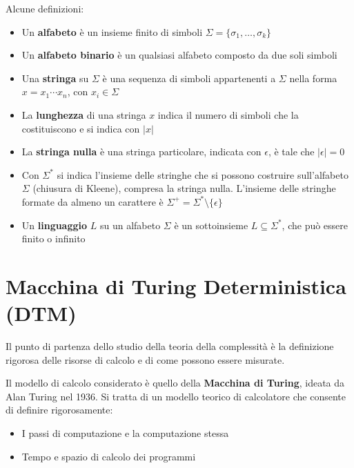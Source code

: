 Alcune definizioni:
\begin{itemize}
	\item Un \textbf{alfabeto} è un insieme finito di simboli $\Sigma = \{\sigma_1, \dots, \sigma_k\}$
	
    \item Un \textbf{alfabeto binario} è un qualsiasi alfabeto composto da due soli simboli
	
    \item Una \textbf{stringa} su $\Sigma$ è una sequenza di simboli appartenenti a $\Sigma$ nella forma $x = x_1 \cdots x_n$, con $x_i \in \Sigma$
	
    \item La \textbf{lunghezza} di una stringa $x$ indica il numero di simboli che la costituiscono e si indica con $|x|$
	
    \item La \textbf{stringa nulla} è una stringa particolare, indicata con $\epsilon$, è tale che $|\epsilon| = 0$
	
    \item Con $\Sigma^\ast$ si indica l'insieme delle stringhe che si possono costruire sull'alfabeto $\Sigma$ (chiusura di Kleene), compresa la stringa nulla. L'insieme delle stringhe formate da almeno un carattere è $\Sigma^+ = \Sigma^\ast \setminus \{\epsilon\}$
	
    \item Un \textbf{linguaggio} $L$ su un alfabeto $\Sigma$ è un sottoinsieme $L \subseteq \Sigma^\ast$, che può essere finito o infinito
\end{itemize}

\section{Macchina di Turing Deterministica (DTM)}

Il punto di partenza dello studio della teoria della complessità è la definizione rigorosa delle risorse di calcolo e di come possono essere misurate.

Il modello di calcolo considerato è quello della \textbf{Macchina di Turing}, ideata da Alan Turing nel 1936. Si tratta di un modello teorico di calcolatore che consente di definire rigorosamente: 
\begin{itemize}
	\item I passi di computazione e la computazione stessa
    
	\item Tempo e spazio di calcolo dei programmi
\end{itemize}

